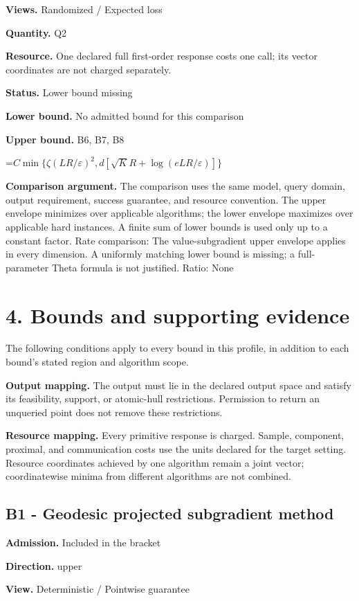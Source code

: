 \documentclass[10pt,a4paper]{article}
\newcommand{\AtlasMath}[1]{\par\begingroup\centering\setbox0=\hbox{$\displaystyle #1$}\ifdim\wd0>1.4\linewidth\typeout{ATLAS WIDE FORMULA: \the\wd0}\fi\ifdim\wd0>\linewidth\resizebox{\linewidth}{!}{\box0}\else\box0\fi\par\endgroup}
\begin{document}
\textbf{Views.} Randomized / Expected loss

\textbf{Quantity.} Q2

\textbf{Resource.} One declared full first-order response costs one call; its vector coordinates are not charged separately.

\textbf{Status.} Lower bound missing

\textbf{Lower bound.} No admitted bound for this comparison

\textbf{Upper bound.} B6, B7, B8

\AtlasMath{C\min\{\zeta(LR/\varepsilon)^2,d[\sqrt K R+\log(eLR/\varepsilon)]\}}
\textbf{Comparison argument.} The comparison uses the same model, query domain, output requirement, success guarantee, and resource convention. The upper envelope minimizes over applicable algorithms; the lower envelope maximizes over applicable hard instances. A finite sum of lower bounds is used only up to a constant factor. Rate comparison: The value-subgradient upper envelope applies in every dimension. A uniformly matching lower bound is missing; a full-parameter Theta formula is not justified. Ratio: None

\section{4. Bounds and supporting evidence}
The following conditions apply to every bound in this profile, in addition to each bound's stated region and algorithm scope.

\textbf{Output mapping.} The output must lie in the declared output space and satisfy its feasibility, support, or atomic-hull restrictions. Permission to return an unqueried point does not remove these restrictions.

\textbf{Resource mapping.} Every primitive response is charged. Sample, component, proximal, and communication costs use the units declared for the target setting. Resource coordinates achieved by one algorithm remain a joint vector; coordinatewise minima from different algorithms are not combined.

\subsection{B1 - Geodesic projected subgradient method}
\textbf{Admission.} Included in the bracket

\textbf{Direction.} upper

\textbf{View.} Deterministic / Pointwise guarantee
\end{document}
